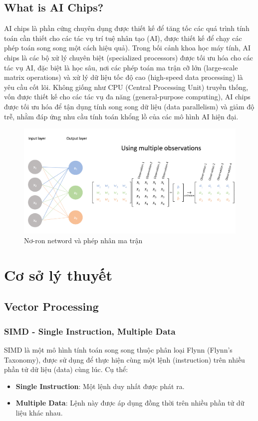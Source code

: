 \documentclass[a4paper]{article}
\begin{document}
\subsection{What is AI Chips?}
AI chips là phần cứng chuyên dụng được thiết kế để tăng tốc các quá trình tính toán cần thiết cho các tác vụ trí tuệ nhân tạo (AI), được thiết kế để chạy các phép toán song song một cách hiệu quả). Trong bối cảnh khoa học máy tính, AI chips là các bộ xử lý chuyên biệt (specialized processors) được tối ưu hóa cho các tác vụ AI, đặc biệt là học sâu, nơi các phép toán ma trận cỡ lớn (large-scale matrix operations) và xử lý dữ liệu tốc độ cao (high-speed data processing) là yêu cầu cốt lõi. Không giống như CPU (Central Processing Unit) truyền thống, vốn được thiết kế cho các tác vụ đa năng (general-purpose computing), AI chips được tối ưu hóa để tận dụng tính song song dữ liệu (data parallelism) và giảm độ trễ, nhằm đáp ứng nhu cầu tính toán khổng lồ của các mô hình AI hiện đại.
\begin{figure}[H]
    \centering
    \includegraphics[width=1\linewidth]{assets/dl-mt.png}
    \caption{Nơ-ron netword và phép nhân ma trận}
    \label{fig:enter-label}
\end{figure}

\section{Cơ sở lý thuyết}
\subsection{Vector Processing}
\subsubsection{SIMD - Single Instruction, Multiple Data}
SIMD là một mô hình tính toán song song thuộc phân loại Flynn (Flynn's Taxonomy), được sử dụng để thực hiện cùng một lệnh (instruction) trên nhiều phần tử dữ liệu (data) cùng lúc. Cụ thể:
\begin{itemize}
\item \textbf{Single Instruction}: Một lệnh duy nhất được phát ra.
\item \textbf{Multiple Data}: Lệnh này được áp dụng đồng thời trên nhiều phần tử dữ liệu khác nhau.
\end{itemize}
 
\end{document}
